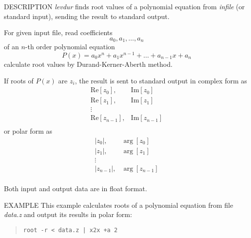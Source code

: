 \begin{qsection}{DESCRIPTION}
{\em levdur} finds root values of a polynomial equation
from {\em infile} (or standard input), 
sending the result to standard output.

For given input file, read coefficients
\begin{displaymath}
  a_0, a_1, \dots, a_n
\end{displaymath}
of an $n$-th order polynomial equation
\begin{displaymath}
  P(x) = a_0x^n + a_1x^{n-1} + \dots + a_{n-1}x + a_n
\end{displaymath}
calculate root values by Durand-Kerner-Aberth method.
\par
If roots of $P(x)$ are $z_i$, 
the result is sent to standard output 
in complex form as
\begin{displaymath}
   \begin{matrix}
   \mathrm{Re}[z_0], & \mathrm{Im}[z_0] \\
   \mathrm{Re}[z_1], & \mathrm{Im}[z_1] \\
   \vdots            &                  \\
   \mathrm{Re}[z_{n-1}], & \mathrm{Im}[z_{n-1}] \\
   \end{matrix}
\end{displaymath}
or polar form as
\begin{displaymath}
   \begin{matrix}
   |z_0|, & \arg[z_0] \\
   |z_1|, & \arg[z_1] \\
   \vdots &           \\
   |z_{n-1}|, & \arg[z_{n-1}] \\
   \end{matrix}
\end{displaymath}
\par
Both input and output data are in float format.
\end{qsection}

\begin{options}
\end{options}

\begin{qsection}{EXAMPLE}
This example calculates roots of a polynomial equation from file {\em data.z}
and output its results in polar form:
\begin{quote}
 \verb!root -r < data.z | x2x +a 2!
\end{quote}
\end{qsection}

% 
